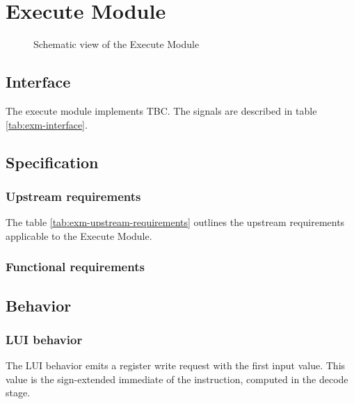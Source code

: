 \section{Execute Module}

\begin{figure}[h!]
    \centering
    
    \caption{Schematic view of the Execute Module}
    \label{fig:exm}
\end{figure}

\subsection{Interface}

\begin{content}
The execute module implements TBC. The signals are described in table \ref{tab:exm-interface}. 
\end{content}



\subsection{Specification}

\subsubsection{Upstream requirements}

The table \ref{tab:exm-upstream-requirements} outlines the upstream requirements applicable to the Execute Module.



\subsubsection{Functional requirements}

\subsection{Behavior}

\subsubsection{LUI behavior}

\begin{content}
    The LUI behavior emits a register write request with the first input value. This value is the sign-extended immediate of the instruction, computed in the decode stage.
\end{content}

